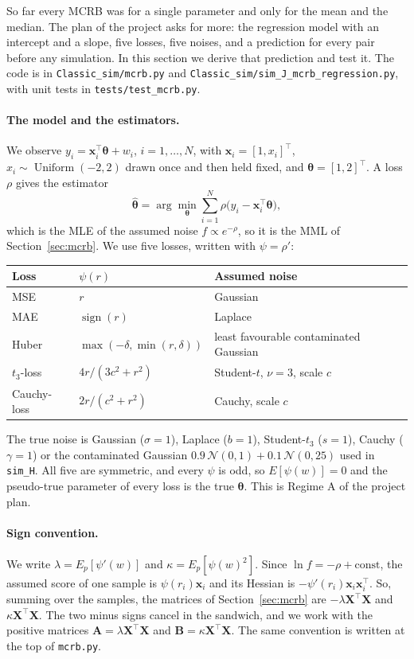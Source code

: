\documentclass[11pt]{article}
\numberwithin{figure}{section}
\numberwithin{equation}{section}
\begin{document}
So far every MCRB was for a single parameter and only for the mean and the median. The plan of the
project asks for more: the regression model with an intercept and a slope, five losses, five noises,
and a prediction for every pair before any simulation. In this section we derive that prediction and
test it. The code is in \texttt{Classic\_sim/mcrb.py} and \texttt{Classic\_sim/sim\_J\_mcrb\_regression.py},
with unit tests in \texttt{tests/test\_mcrb.py}.

\paragraph{The model and the estimators.} We observe $y_i = \mathbf{x}_i^\top\boldsymbol\theta + w_i$,
$i = 1,\dots,N$, with $\mathbf{x}_i = [1, x_i]^\top$, $x_i \sim \operatorname{Uniform}(-2, 2)$ drawn once and then held
fixed, and $\boldsymbol\theta = [1, 2]^\top$. A loss $\rho$ gives the estimator
\[
  \hat{\boldsymbol\theta} = \arg\min_{\boldsymbol\theta}\sum_{i=1}^N \rho\bigl(y_i - \mathbf{x}_i^\top\boldsymbol\theta\bigr),
\]
which is the MLE of the assumed noise $f \propto e^{-\rho}$, so it is the MML of Section~\ref{sec:mcrb}.
We use five losses, written with $\psi = \rho'$:
\begin{center}
\begin{tabular}{lll}
\toprule
Loss & $\psi(r)$ & Assumed noise \\
\midrule
MSE & $r$ & Gaussian \\
MAE & $\operatorname{sign}(r)$ & Laplace \\
Huber & $\max(-\delta, \min(r, \delta))$ & least favourable contaminated Gaussian~\cite{huber64} \\
$t_3$-loss & $4r/(3c^2 + r^2)$ & Student-$t$, $\nu = 3$, scale $c$ \\
Cauchy-loss & $2r/(c^2 + r^2)$ & Cauchy, scale $c$ \\
\bottomrule
\end{tabular}
\end{center}
The true noise is Gaussian ($\sigma = 1$), Laplace ($b = 1$), Student-$t_3$ ($s = 1$), Cauchy ($\gamma = 1$) or the
contaminated Gaussian $0.9\,\mathcal N(0,1) + 0.1\,\mathcal N(0, 25)$ used in \texttt{sim\_H}. All five are
symmetric, and every $\psi$ is odd, so $E[\psi(w)] = 0$ and the pseudo-true parameter of every loss is the
true $\boldsymbol\theta$. This is Regime A of the project plan.

\paragraph{Sign convention.} We write $\lambda = E_p[\psi'(w)]$ and $\kappa = E_p[\psi(w)^2]$. Since
$\ln f = -\rho + \text{const}$, the assumed score of one sample is $\psi(r_i)\mathbf{x}_i$ and its Hessian is
$-\psi'(r_i)\mathbf{x}_i\mathbf{x}_i^\top$. So, summing over the samples, the matrices of
Section~\ref{sec:mcrb} are $-\lambda\mathbf{X}^\top\mathbf{X}$ and $\kappa\mathbf{X}^\top\mathbf{X}$. The two minus signs
cancel in the sandwich, and we work with the positive matrices $\mathbf{A} = \lambda\mathbf{X}^\top\mathbf{X}$ and
$\mathbf{B} = \kappa\mathbf{X}^\top\mathbf{X}$. The same convention is written at the top of \texttt{mcrb.py}.
\end{document}
